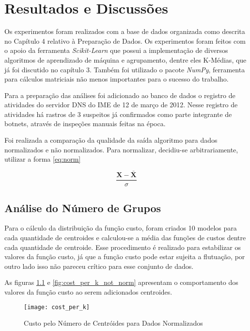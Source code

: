 \chapter{Resultados e Discussões}\label{ch:discussion}

Os experimentos foram realizados com a base de dados organizada como descrita no Capítulo 4 relativo à Preparação de Dados. Os experimentos foram feitos com o apoio da ferramenta \textit{Scikit-Learn} que possui a implementação de diversos algoritmos de aprendizado de máquina e agrupamento, dentre eles K-Médias, que já foi discutido no capítulo 3. Também foi utilizado o pacote \textit{NumPy}, ferramenta para cálculos matriciais não menos importantes para o sucesso do trabalho.

Para a preparação das análises foi adicionado ao banco de dados o registro de atividades do servidor DNS do IME de 12 de março de 2012. Nesse registro de atividades há rastros de 3 suspeitos já confirmados como parte integrante de botnets, através de inspeções manuais feitas na época.

Foi realizada a comparação da qualidade da saída algoritmo para dados normalizados e não normalizados. Para normalizar, decidiu-se arbitrariamente, utilizar a forma \ref{eq:norm}

\begin{equation} \label{eq:norm}
\frac{\mathbf{X} - \mathbf{\bar{X}}}{\sigma}
\end{equation}

\section{Análise do Número de Grupos}

Para o cálculo da distribuição da função custo, foram criados 10 modelos para cada quantidade de centroides e calculou-se a média das funções de custos dentre cada quantidade de centroide. Esse procedimento é realizado para estabilizar os valores da função custo, já que a função custo pode estar sujeita a flutuação, por outro lado isso não pareceu crítico para esse conjunto de dados.

As figuras \ref{fig:cost_per_k} e \ref{fig:cost_per_k_not_norm} apresentam o comportamento dos valores da função custo ao serem adicionados centroides.

\begin{figure}[htbp]
\centering
\texttt{[image: cost\_per\_k]}
\caption[Custo pelo Número de Centróides para Dados Normalizados]{Custo pelo Número de Centróides para Dados Normalizados} \label{fig:cost_per_k}
\end{figure}

